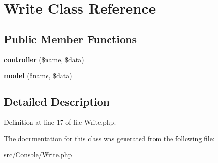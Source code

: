 \hypertarget{class_zest_1_1_console_1_1_write}{}\section{Write Class Reference}
\label{class_zest_1_1_console_1_1_write}
\subsection*{Public Member Functions}
\begin{DoxyCompactItemize}
\item 
\mbox{\label{class_zest_1_1_console_1_1_write_ae9f0ea7377cbed5cd6589f713007f3ed}} 
{\bfseries controller} (\$name, \$data)
\item 
\mbox{\label{class_zest_1_1_console_1_1_write_a431e9537dc8167b0befeb410f7cf7ac0}} 
{\bfseries model} (\$name, \$data)
\end{DoxyCompactItemize}


\subsection{Detailed Description}


Definition at line 17 of file Write.\+php.



The documentation for this class was generated from the following file\+:\begin{DoxyCompactItemize}
\item 
src/\+Console/Write.\+php\end{DoxyCompactItemize}
